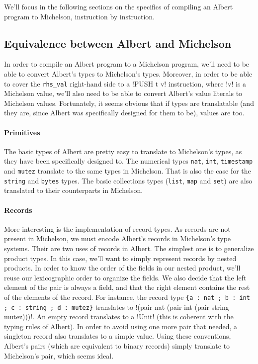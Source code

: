 \documentclass{report}
\begin{document}
We'll focus in the following sections on the specifics of compiling an Albert program to Michelson, instruction by instruction.

\subsection{Equivalence between Albert and Michelson}
\label{alberteqmichelson}

In order to compile an Albert program to a Michelson program, we'll need to be able to convert Albert's types to Michelson's types. Moreover, in order to be able to cover the \texttt{rhs\_val} right-hand side to a !PUSH t v! instruction, where !v! is a Michelson value, we'll also need to be able to convert Albert's value literals to Michelson values. Fortunately, it seems obvious that if types are translatable (and they are, since Albert was specifically designed for them to be), values are too.

\paragraph{Primitives}

The basic types of Albert are pretty easy to translate to Michelson's types, as they have been specifically designed to. The numerical types \texttt{nat}, \texttt{int}, \texttt{timestamp} and \texttt{mutez} translate to the same types in Michelson. That is also the case for the \texttt{string} and \texttt{bytes} types. The basic collections types (\texttt{list}, \texttt{map} and \texttt{set}) are also translated to their counterparts in Michelson.

\paragraph{Records}
More interesting is the implementation of record types. As records are not present in Michelson, we must encode Albert's records in Michelson's type systems. Their are two uses of records in Albert. The simplest one is to generalize product types. In this case, we'll want to simply represent records by nested products. In order to know the order of the fields in our nested product, we'll reuse our lexicographic order to organize the fields. We also decide that the left element of the pair is always a field, and that the right element contains the rest of the elements of the record. For instance, the record type \lstinline|{a : nat ; b : int ; c : string ; d : mutez}| translates to !(pair nat (pair int (pair string mutez)))!. An empty record translates to a !Unit! (this is coherent with the typing rules of Albert). In order to avoid using one more pair that needed, a singleton record also translates to a simple value. Using these conventions, Albert's pairs (which are equivalent to binary records) simply translate to Michelson's pair, which seems ideal.
\end{document}
